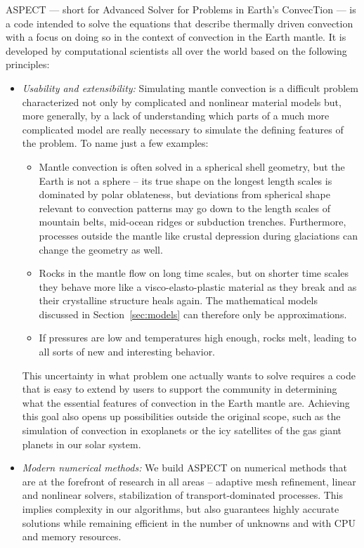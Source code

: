 \documentclass{article}
\newcommand{\aspect}{\textsc{ASPECT}}
\begin{document}
\aspect{} --- short for Advanced Solver for Problems in Earth's ConvecTion ---
is a code intended to solve the equations that describe thermally driven
convection with a focus on doing so in the context of convection in the Earth
mantle. It is developed by computational scientists all over the world
based on the following principles:
\begin{itemize}
\item \textit{Usability and extensibility:} Simulating mantle convection is a
  difficult problem characterized not only by complicated and nonlinear
  material models but, more generally, by a lack of understanding which parts
  of a much more complicated model are really necessary to simulate the
  defining features of the problem. To name just a few examples:
  \begin{itemize}
  \item Mantle convection is often solved in a spherical shell geometry, but
    the Earth is not a sphere -- its true shape on the longest length scales is
    dominated by polar oblateness, but deviations from spherical shape
    relevant to convection patterns may go down to the length scales of
    mountain belts, mid-ocean ridges or subduction trenches. Furthermore,
    processes outside the mantle like crustal depression during glaciations
    can change the geometry as well.
  \item Rocks in the mantle flow on long time scales, but on shorter time
    scales they behave more like a visco-elasto-plastic material as they break
    and as their crystalline structure heals again. The mathematical models
    discussed in Section~\ref{sec:models} can therefore only be
    approximations.
    \item If pressures are low and temperatures high enough, rocks melt,
      leading to all sorts of new and interesting behavior.
  \end{itemize}
  This uncertainty in what problem one actually wants to solve requires a code
  that is easy to extend by users to support the community in determining what
  the essential features of convection in the Earth mantle are. Achieving this
  goal also opens up possibilities outside the original scope, such as the
  simulation of convection in exoplanets or the icy satellites of the gas
  giant planets in our solar system.

\item \textit{Modern numerical methods:} We build \aspect{} on numerical
  methods that are at the forefront of research in all areas -- adaptive mesh
  refinement, linear and nonlinear solvers, stabilization of
  transport-dominated processes. This implies complexity in our algorithms,
  but also guarantees highly accurate solutions while remaining efficient in
  the number of unknowns and with CPU and memory resources.


\end{itemize}
\end{document}
